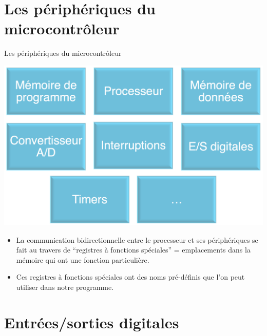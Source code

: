 \section{Les périphériques du
microcontrôleur}\label{les-puxe9riphuxe9riques-du-microcontruxf4leur}

\begin{frame}{Les périphériques du microcontrôleur}

\begin{center}
\includegraphics[width=.5\textwidth]{images/architecture.png}
\end{center}

\begin{itemize}
\itemsep1pt\parskip0pt
\item
  La communication bidirectionnelle entre le processeur et ses
  périphériques se fait au travers de ``registres à fonctions
  spéciales'' = emplacements dans la mémoire qui ont une fonction
  particulière.
\item
  Ces registres à fonctions spéciales ont des noms pré-définis que l'on
  peut utiliser dans notre programme.
\end{itemize}

\end{frame}

\section{Entrées/sorties digitales}\label{entruxe9essorties-digitales}

